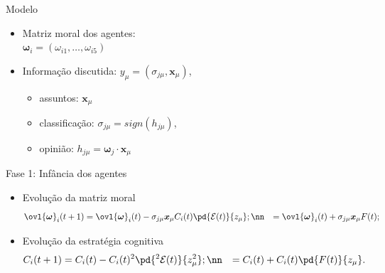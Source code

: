 \documentclass{beamer}
\begin{document}
    \begin{frame}{Modelo}%
       \begin{itemize}
           \item <1-> Matriz moral dos agentes:\\
                 $\bm \omega_i = (\omega_{i 1},\ldots,\omega_{i 5})$

            \item <2-> Informação discutida:
                $y_\mu=(\sigma_{j\mu},\bm x_\mu)$,
                \begin{itemize}
                    \item assuntos: $\bm x_\mu$
                    \item classificação: $\sigma_{j\mu} =  sign(h_{j\mu})$,
                    \item opinião: $h_{j\mu} = \bm \omega_j \cdot \bm x_\mu$
                \end{itemize}

       \end{itemize}

    \end{frame}%

    \begin{frame}{Fase 1: Infância dos agentes}%
        \begin{itemize}
            \item <1-> Evolução da matriz moral  
                \begin{align}
                    \ovl{\bm \omega}_i(t+1) 
                    &= \ovl{\bm \omega}_i(t) - 
                    \sigma_{j\mu} \bm x_\mu C_i(t)\pd{\mathcal E (t)}{z_\mu}; \nn
                    &= \ovl{\bm \omega}_i(t) + \sigma_{j\mu} \bm x_\mu  F(t); 
                \end{align}
             \item <2-> Evolução da estratégia cognitiva
                \begin{align}
                    C_i(t+1) 
                    &= C_i(t) - C_i(t)^2 \pd{^2 \mathcal E (t)}{z_\mu^2}; \nn
                    &= C_i(t) + C_i(t) \pd{F(t)}{z_\mu}.
                    \label{eq:C}
                \end{align}
        \end{itemize}

   \end{frame}%
\end{document}
